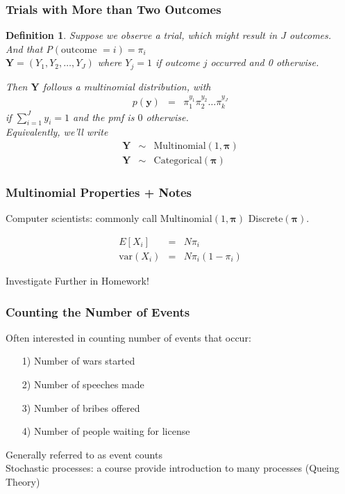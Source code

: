 \documentclass{beamer}
\newtheorem{defn}{Definition}
\numberwithin{equation}{section}
\begin{document}
\begin{frame}
\frametitle{Trials with More than Two Outcomes}


\begin{defn}
Suppose we observe a trial, which might result in $J$ outcomes.  \\
And that P$(\text{outcome } = i) = \pi_{i}$ \\
$\boldsymbol{Y} = (Y_{1}, Y_{2}, \hdots, Y_{J})$  where $Y_{j} = 1$ if outcome $j$ occurred and 0 otherwise. 

Then $\boldsymbol{Y}$ follows a \alert{multinomial} distribution, with \\
\begin{eqnarray}
p(\boldsymbol{y} ) & = & \pi_{1}^{y_{1}} \pi_{2}^{y_{2} } \hdots \pi_{k}^{y_{J}} \nonumber 
\end{eqnarray}
if $\sum_{i=1}^{J} y_{i} = 1$ and the pmf is $0$ otherwise.  \\
Equivalently, we'll write 
\begin{eqnarray}
\boldsymbol{Y} & \sim & \text{Multinomial}(1, \boldsymbol{\pi}) \nonumber \\
\boldsymbol{Y} & \sim & \text{Categorical}(\boldsymbol{\pi}) \nonumber 
\end{eqnarray}
\end{defn}
\end{frame}


\begin{frame}
\frametitle{Multinomial Properties + Notes}
Computer scientists: commonly call Multinomial$(1, \boldsymbol{\pi})$ \alert{Discrete}$(\boldsymbol{\pi})$. 

\begin{eqnarray}
E[X_{i} ] & = &  N \pi_{i} \nonumber \\
\text{var}(X_{i} ) & = &  N \pi_{i} (1- \pi_{i}) \nonumber 
\end{eqnarray}



\alert{Investigate Further in Homework!}


\end{frame}

\begin{frame}
\frametitle{Counting the Number of Events}

Often interested in counting number of events that occur:
\begin{itemize}
\item[1)] Number of wars started
\item[2)] Number of speeches made
\item[3)] Number of bribes offered
\item[4)] Number of people waiting for license
\end{itemize}

Generally referred to as \alert{event counts}\\
\alert{Stochastic processes}: a course provide introduction to many processes (\alert{Queing Theory})


\end{frame}
\end{document}
